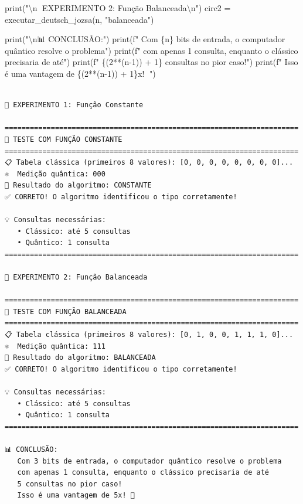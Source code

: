 \documentclass[
  brazilian,
]{report}
\newenvironment{Shaded}{\begin{snugshade}}{\end{snugshade}}
\newcommand{\BuiltInTok}[1]{\textcolor[rgb]{0.00,0.23,0.31}{#1}}
\newcommand{\CharTok}[1]{\textcolor[rgb]{0.13,0.47,0.30}{#1}}
\newcommand{\DecValTok}[1]{\textcolor[rgb]{0.68,0.00,0.00}{#1}}
\newcommand{\NormalTok}[1]{\textcolor[rgb]{0.00,0.23,0.31}{#1}}
\newcommand{\OperatorTok}[1]{\textcolor[rgb]{0.37,0.37,0.37}{#1}}
\newcommand{\SpecialCharTok}[1]{\textcolor[rgb]{0.37,0.37,0.37}{#1}}
\newcommand{\SpecialStringTok}[1]{\textcolor[rgb]{0.13,0.47,0.30}{#1}}
\newcommand{\StringTok}[1]{\textcolor[rgb]{0.13,0.47,0.30}{#1}}
\begin{document}
\begin{tcolorbox}
\begin{Shaded}
\begin{Highlighting}[]
\BuiltInTok{print}\NormalTok{(}\StringTok{"}\CharTok{\textbackslash{}n}\StringTok{🔬 EXPERIMENTO 2: Função Balanceada}\CharTok{\textbackslash{}n}\StringTok{"}\NormalTok{)}
\NormalTok{circ2 }\OperatorTok{=}\NormalTok{ executar\_deutsch\_jozsa(n, }\StringTok{"balanceada"}\NormalTok{)}

\BuiltInTok{print}\NormalTok{(}\StringTok{"}\CharTok{\textbackslash{}n}\StringTok{📊 CONCLUSÃO:"}\NormalTok{)}
\BuiltInTok{print}\NormalTok{(}\SpecialStringTok{f"   Com }\SpecialCharTok{\{}\NormalTok{n}\SpecialCharTok{\}}\SpecialStringTok{ bits de entrada, o computador quântico resolve o problema"}\NormalTok{)}
\BuiltInTok{print}\NormalTok{(}\SpecialStringTok{f"   com apenas 1 consulta, enquanto o clássico precisaria de até"}\NormalTok{)}
\BuiltInTok{print}\NormalTok{(}\SpecialStringTok{f"   }\SpecialCharTok{\{}\NormalTok{(}\DecValTok{2}\OperatorTok{**}\NormalTok{(n}\OperatorTok{{-}}\DecValTok{1}\NormalTok{)) }\OperatorTok{+} \DecValTok{1}\SpecialCharTok{\}}\SpecialStringTok{ consultas no pior caso!"}\NormalTok{)}
\BuiltInTok{print}\NormalTok{(}\SpecialStringTok{f"   Isso é uma vantagem de }\SpecialCharTok{\{}\NormalTok{(}\DecValTok{2}\OperatorTok{**}\NormalTok{(n}\OperatorTok{{-}}\DecValTok{1}\NormalTok{)) }\OperatorTok{+} \DecValTok{1}\SpecialCharTok{\}}\SpecialStringTok{x! 🚀"}\NormalTok{)}
\end{Highlighting}
\end{Shaded}

\end{tcolorbox}

\begin{verbatim}

🔬 EXPERIMENTO 1: Função Constante

======================================================================
🧪 TESTE COM FUNÇÃO CONSTANTE
======================================================================
📋 Tabela clássica (primeiros 8 valores): [0, 0, 0, 0, 0, 0, 0, 0]...
⚛️  Medição quântica: 000
🎯 Resultado do algoritmo: CONSTANTE
✅ CORRETO! O algoritmo identificou o tipo corretamente!

💡 Consultas necessárias:
   • Clássico: até 5 consultas
   • Quântico: 1 consulta
======================================================================

🔬 EXPERIMENTO 2: Função Balanceada

======================================================================
🧪 TESTE COM FUNÇÃO BALANCEADA
======================================================================
📋 Tabela clássica (primeiros 8 valores): [0, 1, 0, 0, 1, 1, 1, 0]...
⚛️  Medição quântica: 111
🎯 Resultado do algoritmo: BALANCEADA
✅ CORRETO! O algoritmo identificou o tipo corretamente!

💡 Consultas necessárias:
   • Clássico: até 5 consultas
   • Quântico: 1 consulta
======================================================================

📊 CONCLUSÃO:
   Com 3 bits de entrada, o computador quântico resolve o problema
   com apenas 1 consulta, enquanto o clássico precisaria de até
   5 consultas no pior caso!
   Isso é uma vantagem de 5x! 🚀
\end{verbatim}
\end{document}
